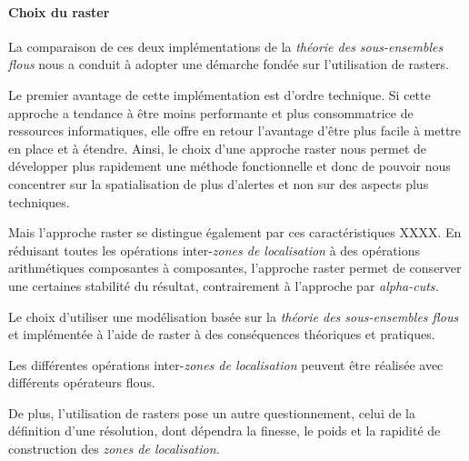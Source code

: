 

\paragraph{Choix du raster}


La comparaison de ces deux implémentations de la \emph{théorie des
sous-ensembles flous} nous a conduit à adopter une démarche fondée sur
l'utilisation de rasters.




Le premier avantage de cette implémentation est d'ordre technique. Si
cette approche a tendance à être moins performante et plus
consommatrice de ressources informatiques, elle offre en retour
l'avantage d'être plus facile à mettre en place et à étendre. Ainsi,
le choix d'une approche raster nous permet de développer plus
rapidement une méthode fonctionnelle et donc de pouvoir nous
concentrer sur la spatialisation de plus d'alertes et non sur des
aspects plus techniques.


Mais l'approche raster se distingue également par ces caractéristiques
XXXX. En réduisant toutes les opérations inter-\emph{zones de
  localisation} à des opérations arithmétiques composantes à
composantes, l'approche raster permet de conserver une certaines
stabilité du résultat, contrairement à l'approche par
\emph{alpha-cuts.}


Le choix d'utiliser une modélisation basée sur la \emph{théorie des
sous-ensembles flous} et implémentée à l'aide de raster à des
conséquences théoriques et pratiques.


Les différentes opérations inter-\emph{zones de localisation} peuvent
être réalisée avec différents opérateurs flous.


De plus, l'utilisation de rasters pose un autre questionnement, celui
de la définition d'une résolution, dont dépendra la finesse, le poids
et la rapidité de construction des \emph{zones de localisation.}


